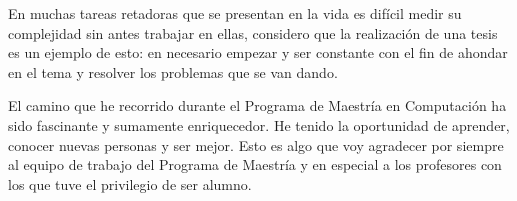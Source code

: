 En muchas tareas retadoras que se presentan en la vida es difícil medir su complejidad sin antes trabajar en ellas, considero que la realización de una tesis es un ejemplo de esto: en necesario empezar y ser constante con el fin de ahondar en el tema y resolver los problemas que se van dando.

El camino que he recorrido durante el Programa de Maestría en Computación ha sido fascinante y sumamente enriquecedor. He tenido la oportunidad de aprender, conocer nuevas personas y ser mejor. Esto es algo que voy agradecer por siempre al equipo de trabajo del Programa de Maestría y en especial a los profesores con los que tuve el privilegio de ser alumno.